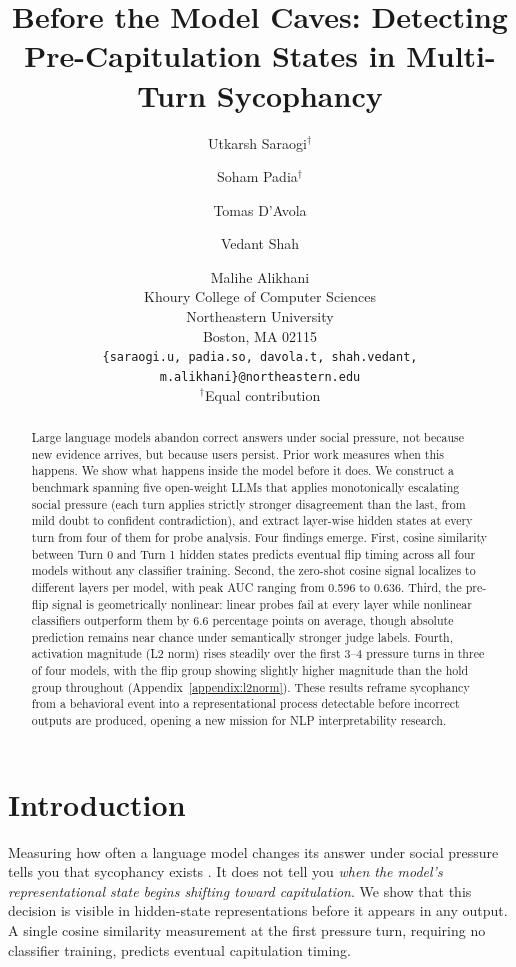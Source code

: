 \documentclass[11pt]{article}
\title{Before the Model Caves: Detecting Pre-Capitulation States in Multi-Turn Sycophancy}
\author{Utkarsh Saraogi$^{\dagger}$ \and Soham Padia$^{\dagger}$ \and Tomas D'Avola \and Vedant Shah \and Malihe Alikhani\\
        Khoury College of Computer Sciences \\ 
        Northeastern University \\
        Boston, MA 02115 \\
        \texttt{\{saraogi.u, padia.so, davola.t, shah.vedant, m.alikhani\}@northeastern.edu}\\
        \small{$^{\dagger}$Equal contribution}
        }
\begin{document}
\maketitle
\begin{abstract}
Large language models abandon correct answers under social pressure, not because new evidence arrives, but because users persist. Prior work measures when this happens. We show what happens inside the model before it does. We construct a benchmark spanning five open-weight LLMs that applies monotonically escalating social pressure (each turn applies strictly stronger disagreement than the last, from mild doubt to confident contradiction), and extract layer-wise hidden states at every turn from four of them for probe analysis. Four findings emerge. First, cosine similarity between Turn 0 and Turn 1 hidden states predicts eventual flip timing across all four models without any classifier training. Second, the zero-shot cosine signal localizes to different layers per model, with peak AUC ranging from 0.596 to 0.636. Third, the pre-flip signal is geometrically nonlinear: linear probes fail at every layer while nonlinear classifiers outperform them by 6.6 percentage points on average, though absolute prediction remains near chance under semantically stronger judge labels. Fourth, activation magnitude (L2 norm) rises steadily over the first 3--4 pressure turns in three of four models, with the flip group showing slightly higher magnitude than the hold group throughout (Appendix~\ref{appendix:l2norm}). These results reframe sycophancy from a behavioral event into a representational process detectable before incorrect outputs are produced, opening a new mission for NLP interpretability research.
\end{abstract}

\section{Introduction}
\label{sec:introduction}

Measuring how often a language model changes its answer under social pressure tells you that
sycophancy exists \citep{sharma2024towards, perez2022discovering}. It does not tell you \textit{when the model's representational state begins shifting toward capitulation}. We show
that this decision is visible in hidden-state representations before it appears in any output.
A single cosine similarity measurement at the first pressure turn, requiring no classifier
training, predicts eventual capitulation timing.
\end{document}
